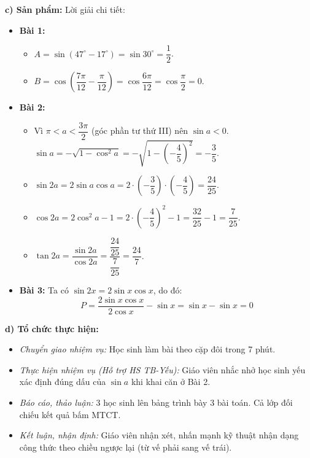 \documentclass[12pt, a4paper]{article}
\begin{document}
\textbf{c) Sản phẩm:} Lời giải chi tiết:
\begin{itemize}[leftmargin=0.6cm]
    \item \textbf{Bài 1:}
    \begin{itemize}[leftmargin=0.5cm]
        \item $A = \sin(47^\circ - 17^\circ) = \sin 30^\circ = \dfrac{1}{2}$.
        \item $B = \cos\left(\dfrac{7\pi}{12} - \dfrac{\pi}{12}\right) = \cos\dfrac{6\pi}{12} = \cos\dfrac{\pi}{2} = 0$.
    \end{itemize}
    \item \textbf{Bài 2:}
    \begin{itemize}[leftmargin=0.5cm]
        \item Vì $\pi < a < \dfrac{3\pi}{2}$ (góc phần tư thứ III) nên $\sin a < 0$.\\
        $\sin a = -\sqrt{1 - \cos^2 a} = -\sqrt{1 - \left(-\dfrac{4}{5}\right)^2} = -\dfrac{3}{5}$.
        \item $\sin 2a = 2\sin a \cos a = 2 \cdot \left(-\dfrac{3}{5}\right) \cdot \left(-\dfrac{4}{5}\right) = \dfrac{24}{25}$.
        \item $\cos 2a = 2\cos^2 a - 1 = 2 \cdot \left(-\dfrac{4}{5}\right)^2 - 1 = \dfrac{32}{25} - 1 = \dfrac{7}{25}$.
        \item $\tan 2a = \dfrac{\sin 2a}{\cos 2a} = \dfrac{\dfrac{24}{25}}{\dfrac{7}{25}} = \dfrac{24}{7}$.
    \end{itemize}
    \item \textbf{Bài 3:} Ta có $\sin 2x = 2\sin x \cos x$, do đó:
    $$P = \dfrac{2\sin x \cos x}{2\cos x} - \sin x = \sin x - \sin x = 0$$
\end{itemize}

\textbf{d) Tổ chức thực hiện:}
\begin{itemize}[leftmargin=0.6cm]
    \item \textit{Chuyển giao nhiệm vụ:} Học sinh làm bài theo cặp đôi trong 7 phút.
    \item \textit{Thực hiện nhiệm vụ (Hỗ trợ HS TB-Yếu):} Giáo viên nhắc nhở học sinh yếu xác định đúng dấu của $\sin a$ khi khai căn ở Bài 2.
    \item \textit{Báo cáo, thảo luận:} 3 học sinh lên bảng trình bày 3 bài toán. Cả lớp đối chiếu kết quả bấm MTCT.
    \item \textit{Kết luận, nhận định:} Giáo viên nhận xét, nhấn mạnh kỹ thuật nhận dạng công thức theo chiều ngược lại (từ vế phải sang vế trái).
\end{itemize}
\end{document}
